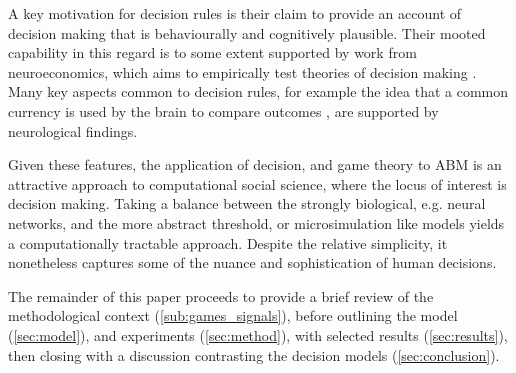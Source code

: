 A key motivation for decision rules is their claim to provide an account of decision making that is behaviourally and cognitively plausible. Their mooted capability in this regard is to some extent supported by work from neuroeconomics, which aims to empirically test theories of decision making \citep{Rustichini2009}. Many key aspects common to decision rules, for example the idea that a common currency is used by the brain to compare outcomes \citep{Padoa-Schioppa2006,Padoa-Schioppa2008}, are supported by neurological findings. 

Given these features, the application of decision, and game theory to \ac{ABM} is an attractive approach to computational social science, where the locus of interest is decision making. Taking a balance between the strongly biological, e.g. neural networks, and the more abstract threshold, or microsimulation like models yields a computationally tractable approach. Despite the relative simplicity, it nonetheless captures some of the nuance and sophistication of human decisions.


The remainder of this paper proceeds to provide a brief review of the methodological context (\ref{sub:games_signals}), before outlining the model (\ref{sec:model}), and experiments (\ref{sec:method}), with selected results (\ref{sec:results}), then closing with a discussion contrasting the decision models (\ref{sec:conclusion}).